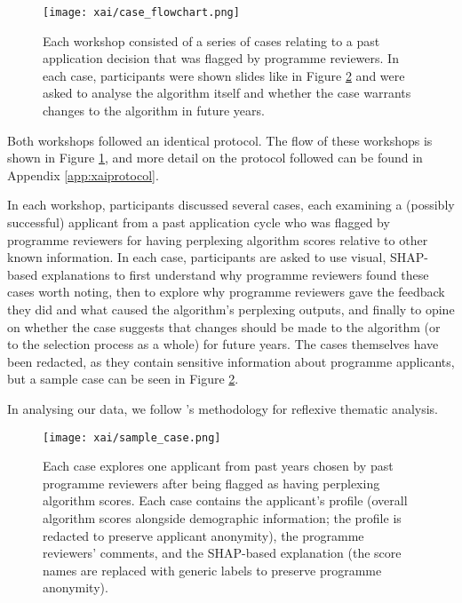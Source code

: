 \begin{figure}[htbp]
    \centering
    \texttt{[image: xai/case\_flowchart.png]}
    \caption{Each workshop consisted of a series of cases relating to a past application decision that was flagged by programme reviewers. In each case, participants were shown slides like in Figure \ref{fig:sample_case} and were asked to analyse the algorithm itself and whether the case warrants changes to the algorithm in future years.}
    \label{fig:case_flowchart}
\end{figure}

Both workshops followed an identical protocol. The flow of these workshops is shown in Figure \ref{fig:case_flowchart}, and more detail on the protocol followed can be found in Appendix \ref{app:xaiprotocol}.

In each workshop, participants discussed several cases, each examining a (possibly successful) applicant from a past application cycle who was flagged by programme reviewers for having perplexing algorithm scores relative to other known information. In each case, participants are asked to use visual, SHAP-based explanations to first understand why programme reviewers found these cases worth noting, then to explore why programme reviewers gave the feedback they did and what caused the algorithm's perplexing outputs, and finally to opine on whether the case suggests that changes should be made to the algorithm (or to the selection process as a whole) for future years. The cases themselves have been redacted, as they contain sensitive information about programme applicants, but a sample case can be seen in Figure \ref{fig:sample_case}.

In analysing our data, we follow \textcite{braun_using_2006}'s methodology for reflexive thematic analysis. 

\begin{figure}[htbp]
    \centering
    \texttt{[image: xai/sample\_case.png]}
    \caption{Each case explores one applicant from past years chosen by past programme reviewers after being flagged as having perplexing algorithm scores. Each case contains the applicant's profile (overall algorithm scores alongside demographic information; the profile is redacted to preserve applicant anonymity), the programme reviewers' comments, and the SHAP-based explanation (the score names are replaced with generic labels to preserve programme anonymity).}
    \label{fig:sample_case}
    
\end{figure}

